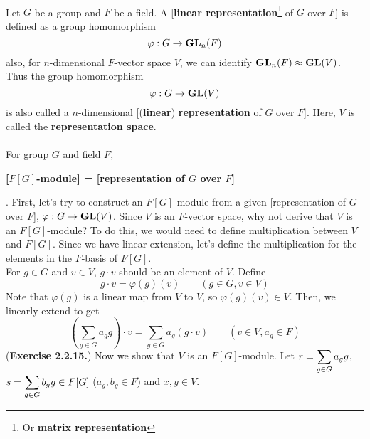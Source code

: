 \\
 Let $G$ be a group and $F$ be a field. A [\textbf{linear representation}\footnote{Or \textbf{matrix representation}} of $G$ over $F$] is defined as a group  homomorphism $$\varphi: G\rightarrow \mathrm{\mathbf{GL}}_n(F)$$
also, for $n$-dimensional $F$-vector space $V$, we can identify $\mathrm{\mathbf{GL}}_n(F) \approx \mathrm{\mathbf{GL}}(V)$. Thus the group homomorphism $$\varphi: G\rightarrow \mathrm{\mathbf{GL}}(V)$$ is also called a $n$-dimensional [(\textbf{linear}) \textbf{representation} of $G$ over $F$]. Here, $V$ is called the \textbf{representation space}.\\
\\
 For group $G$ and field $F$, 
\begin{center}
	\textbf{[$F[G]$-module] = [representation of $G$ over $F$]}
\end{center}
\pf. First, let's try to construct an $F[G]$-module from a given [representation of $G$ over $F$], $\varphi: G\rightarrow \mathrm{\mathbf{GL}}(V)$. Since $V$ is an $F$-vector space, why not derive that $V$ is an $F[G]$-module? To do this, we would need to define multiplication between $V$ and $F[G]$. Since we have linear extension, let's define the multiplication for the elements in the $F$-basis of $F[G]$.\\
For $g\in G$ and $v\in V$, $g\cdot v$ should be an element of $V$. Define
$$g\cdot v = \varphi(g)(v) \qquad (g\in G, v\in V)$$
Note that $\varphi(g)$ is a linear map from $V$ to $V$, so $\varphi(g)(v)\in V$. Then, we linearly extend to get
$$\left(\sum_{g\in G} a_g g\right)\cdot v = \sum_{g\in G} a_g (g\cdot v) \qquad (v\in V, a_g\in F)$$
({\bfseries \sffamily Exercise 2.2.15.}) Now we show that $V$ is an $F[G]$-module. Let $r = \displaystyle \sum_{g\in G} a_g g$, $s = \displaystyle \sum_{g\in G}b_g g \in F[G]$ ($a_g, b_g \in F$) and $x, y\in V$.
